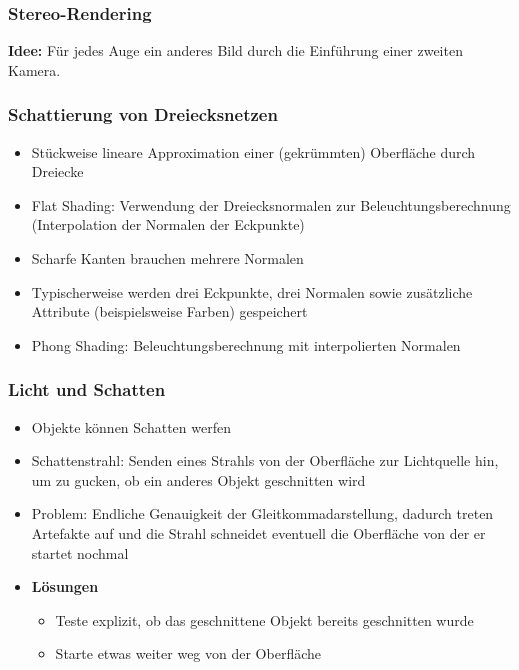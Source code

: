 \subsubsection{Stereo-Rendering}
\textbf{Idee:} Für jedes Auge ein anderes Bild durch die Einführung einer zweiten Kamera.

\subsubsection{Schattierung von Dreiecksnetzen}
\begin{itemize}
	\item Stückweise lineare Approximation einer (gekrümmten) Oberfläche durch Dreiecke
	\item Flat Shading: Verwendung der Dreiecksnormalen zur Beleuchtungsberechnung (Interpolation der Normalen der Eckpunkte)
	\item Scharfe Kanten brauchen mehrere Normalen
	\item Typischerweise werden drei Eckpunkte, drei Normalen sowie zusätzliche Attribute (beispielsweise Farben) gespeichert
	\item Phong Shading: Beleuchtungsberechnung mit interpolierten Normalen
\end{itemize}

\subsubsection{Licht und Schatten}
\begin{itemize}
	\item Objekte können Schatten werfen
	\item Schattenstrahl: Senden eines Strahls von der Oberfläche zur Lichtquelle hin, um zu gucken, ob ein anderes Objekt geschnitten wird
	\item Problem: Endliche Genauigkeit der Gleitkommadarstellung, dadurch treten Artefakte auf und die Strahl schneidet eventuell die Oberfläche von der er startet nochmal
	\item \textbf{Lösungen}
	\begin{itemize}
		\item Teste explizit, ob das geschnittene Objekt bereits geschnitten wurde
		\item Starte etwas weiter weg von der Oberfläche
	\end{itemize}
\end{itemize}

